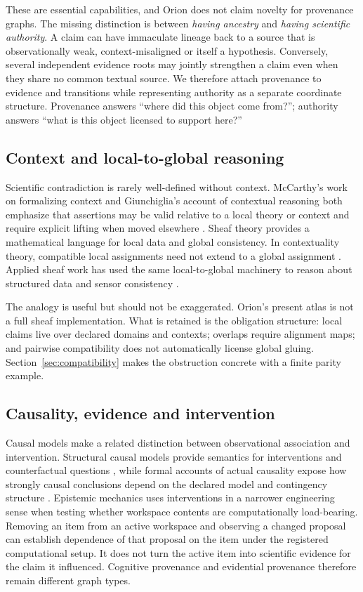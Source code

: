 These are essential capabilities, and Orion does not claim novelty for provenance graphs. The missing distinction is between \emph{having ancestry} and \emph{having scientific authority}. A claim can have immaculate lineage back to a source that is observationally weak, context-misaligned or itself a hypothesis. Conversely, several independent evidence roots may jointly strengthen a claim even when they share no common textual source. We therefore attach provenance to evidence and transitions while representing authority as a separate coordinate structure. Provenance answers ``where did this object come from?''; authority answers ``what is this object licensed to support here?''

\subsection{Context and local-to-global reasoning}

Scientific contradiction is rarely well-defined without context. McCarthy's work on formalizing context and Giunchiglia's account of contextual reasoning both emphasize that assertions may be valid relative to a local theory or context and require explicit lifting when moved elsewhere \cite{mccarthy1993,giunchiglia1993}. Sheaf theory provides a mathematical language for local data and global consistency. In contextuality theory, compatible local assignments need not extend to a global assignment \cite{abramsky2011}. Applied sheaf work has used the same local-to-global machinery to reason about structured data and sensor consistency \cite{curry2014,robinson2017}.

The analogy is useful but should not be exaggerated. Orion's present atlas is not a full sheaf implementation. What is retained is the obligation structure: local claims live over declared domains and contexts; overlaps require alignment maps; and pairwise compatibility does not automatically license global gluing. Section~\ref{sec:compatibility} makes the obstruction concrete with a finite parity example.

\subsection{Causality, evidence and intervention}

Causal models make a related distinction between observational association and intervention. Structural causal models provide semantics for interventions and counterfactual questions \cite{pearl2009}, while formal accounts of actual causality expose how strongly causal conclusions depend on the declared model and contingency structure \cite{halpern2016}. Epistemic mechanics uses interventions in a narrower engineering sense when testing whether workspace contents are computationally load-bearing. Removing an item from an active workspace and observing a changed proposal can establish dependence of that proposal on the item under the registered computational setup. It does not turn the active item into scientific evidence for the claim it influenced. Cognitive provenance and evidential provenance therefore remain different graph types.

